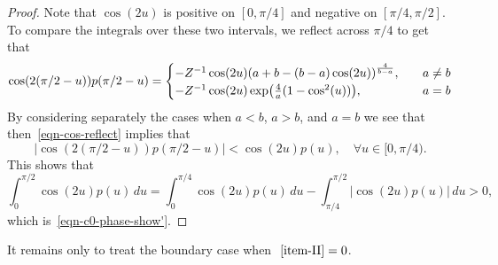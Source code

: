 \documentclass[11pt]{article}
\theoremstyle{plain}
\theoremstyle{definition}
\numberwithin{equation}{section}
\def\allb#1\alle{\begin{align}#1\end{align}}
\newcommand{\eqb}{\begin{equation}}
\newcommand{\eqe}{\end{equation}}
\newcommand{\eqbn}{\begin{equation*}}
\newcommand{\eqen}{\end{equation*}}
\let\originalleft\left
\let\originalright\right
\renewcommand{\left}{\mathopen{}\mathclose\bgroup\originalleft}
\renewcommand{\right}{\aftergroup\egroup\originalright}
\begin{document}
\begin{proof}
Note that $\cos(2u)$ is positive on $[0,\pi/4]$ and negative on $[\pi/4,\pi/2]$. To compare the integrals over these two intervals, we reflect across $\pi/4$ to get that  
\eqb \label{eqn-cos-reflect} 
\cos(2(\pi/2-u)) p(\pi/2-u) 
=  \begin{cases}
- Z^{-1}   \cos(2u) \left( a + b -  (b-a) \cos(2u) \right)^{   \frac{4}{b-a}   }   ,\quad &a\not= b \\
- Z^{-1} \cos(2u) \exp\left(  \frac{4}{a} (1- \cos^2(u) ) \right) ,\quad &a = b 
\end{cases}
\eqe
By considering separately the cases when $a < b$, $a>b$, and $a=b$ we see that then~\eqref{eqn-cos-reflect} implies that 
\eqbn
|\cos(2(\pi/2-u)) p(\pi/2-u)| < \cos(2u) p(u) ,\quad\forall u \in [0,\pi/4). 
\eqen
This shows that
\eqbn
\int_0^{\pi/2} \cos(2u) p(u) \,du =\int_0^{\pi/4} \cos(2u) p(u) \,du - \int_{\pi/4}^{\pi/2} | \cos(2u) p(u)| \,du > 0 ,
\eqen
which is~\eqref{eqn-c0-phase-show'}. 
\end{proof}

It remains only to treat the boundary case when $~\ref{item-II} = 0$. 
\end{document}
